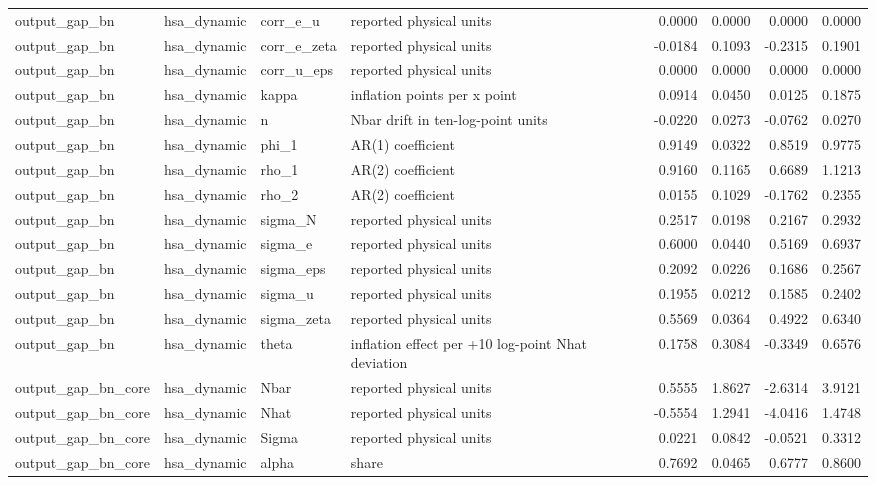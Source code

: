 \begin{tabular}{llllrrrr}
output\_gap\_bn & hsa\_dynamic & corr\_e\_u & reported physical units & 0.0000 & 0.0000 & 0.0000 & 0.0000 \\
output\_gap\_bn & hsa\_dynamic & corr\_e\_zeta & reported physical units & -0.0184 & 0.1093 & -0.2315 & 0.1901 \\
output\_gap\_bn & hsa\_dynamic & corr\_u\_eps & reported physical units & 0.0000 & 0.0000 & 0.0000 & 0.0000 \\
output\_gap\_bn & hsa\_dynamic & kappa & inflation points per x point & 0.0914 & 0.0450 & 0.0125 & 0.1875 \\
output\_gap\_bn & hsa\_dynamic & n & Nbar drift in ten-log-point units & -0.0220 & 0.0273 & -0.0762 & 0.0270 \\
output\_gap\_bn & hsa\_dynamic & phi\_1 & AR(1) coefficient & 0.9149 & 0.0322 & 0.8519 & 0.9775 \\
output\_gap\_bn & hsa\_dynamic & rho\_1 & AR(2) coefficient & 0.9160 & 0.1165 & 0.6689 & 1.1213 \\
output\_gap\_bn & hsa\_dynamic & rho\_2 & AR(2) coefficient & 0.0155 & 0.1029 & -0.1762 & 0.2355 \\
output\_gap\_bn & hsa\_dynamic & sigma\_N & reported physical units & 0.2517 & 0.0198 & 0.2167 & 0.2932 \\
output\_gap\_bn & hsa\_dynamic & sigma\_e & reported physical units & 0.6000 & 0.0440 & 0.5169 & 0.6937 \\
output\_gap\_bn & hsa\_dynamic & sigma\_eps & reported physical units & 0.2092 & 0.0226 & 0.1686 & 0.2567 \\
output\_gap\_bn & hsa\_dynamic & sigma\_u & reported physical units & 0.1955 & 0.0212 & 0.1585 & 0.2402 \\
output\_gap\_bn & hsa\_dynamic & sigma\_zeta & reported physical units & 0.5569 & 0.0364 & 0.4922 & 0.6340 \\
output\_gap\_bn & hsa\_dynamic & theta & inflation effect per +10 log-point Nhat deviation & 0.1758 & 0.3084 & -0.3349 & 0.6576 \\
output\_gap\_bn\_core & hsa\_dynamic & Nbar & reported physical units & 0.5555 & 1.8627 & -2.6314 & 3.9121 \\
output\_gap\_bn\_core & hsa\_dynamic & Nhat & reported physical units & -0.5554 & 1.2941 & -4.0416 & 1.4748 \\
output\_gap\_bn\_core & hsa\_dynamic & Sigma & reported physical units & 0.0221 & 0.0842 & -0.0521 & 0.3312 \\
output\_gap\_bn\_core & hsa\_dynamic & alpha & share & 0.7692 & 0.0465 & 0.6777 & 0.8600 \\

\end{tabular}
